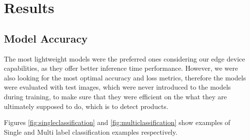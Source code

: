 
\chapter{Results}\label{cap:resultados}

\section{Model Accuracy}

The most lightweight models were the preferred ones considering our edge device capabilities,
as they offer better inference time performance. 
However, we were also looking for the most optimal accuracy and loss metrics, 
therefore the models were evaluated with test images, which were never introduced to the models
during training, to make sure that they were efficient on the what they are ultimately supposed to do, 
which is to detect products.

Figures \ref{fig:singleclassification} and \ref{fig:multiclassification} show examples of 
Single and Multi label classification examples respectively.


